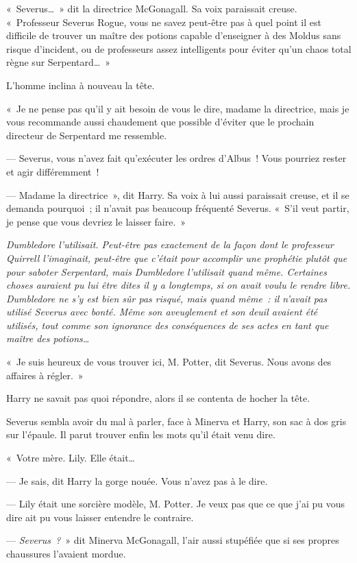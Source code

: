 «~Severus…~» dit la directrice McGonagall. Sa voix paraissait creuse. «~Professeur Severus Rogue, vous ne savez peut-être pas à quel point il est difficile de trouver un maître des potions capable d'enseigner à des Moldus sans risque d'incident, ou de professeurs assez intelligents pour éviter qu'un chaos total règne sur Serpentard…~»

L'homme inclina à nouveau la tête.

«~Je ne pense pas qu'il y ait besoin de vous le dire, madame la directrice, mais je vous recommande aussi chaudement que possible d'éviter que le prochain directeur de Serpentard me ressemble.

--- Severus, vous n'avez fait qu'exécuter les ordres d'Albus~! Vous pourriez rester et agir différemment~!

--- Madame la directrice~», dit Harry. Sa voix à lui aussi paraissait creuse, et il se demanda pourquoi~; il n'avait pas beaucoup fréquenté Severus. «~S'il veut partir, je pense que vous devriez le laisser faire.~»

\emph{Dumbledore l'utilisait. Peut-être pas exactement de la façon dont le professeur Quirrell l'imaginait, peut-être que c'était pour accomplir une prophétie plutôt que pour saboter Serpentard, mais Dumbledore l'utilisait quand même. Certaines choses auraient pu lui être dites il y a longtemps, si on avait voulu le rendre libre. Dumbledore ne s'y est bien sûr pas risqué, mais quand même~: il n'avait pas utilisé Severus avec bonté. Même son aveuglement et son deuil avaient été utilisés, tout comme son ignorance des conséquences de ses actes en tant que maître des potions…}

«~Je suis heureux de vous trouver ici, M. Potter, dit Severus. Nous avons des affaires à régler.~»

Harry ne savait pas quoi répondre, alors il se contenta de hocher la tête.

Severus sembla avoir du mal à parler, face à Minerva et Harry, son sac à dos gris sur l'épaule. Il parut trouver enfin les mots qu'il était venu dire.

«~Votre mère. Lily. Elle était…

--- Je sais, dit Harry la gorge nouée. Vous n'avez pas à le dire.

--- Lily était une sorcière modèle, M. Potter. Je veux pas que ce que j'ai pu vous dire ait pu vous laisser entendre le contraire.

--- \emph{Severus~?}~» dit Minerva McGonagall, l'air aussi stupéfiée que si ses propres chaussures l'avaient mordue.


